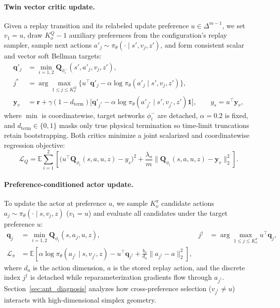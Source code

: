 \paragraph{Twin vector critic update.}
Given a replay transition and its relabeled update preference $u \in \Delta^{m-1}$,
we set $v_1 = u$, draw $K_o^Q - 1$ auxiliary preferences from the configuration's
replay sampler, sample next actions $a'_j \sim \pi_\theta(\cdot \mid s', v_j, z')$,
and form consistent scalar and vector soft Bellman targets:
\begin{align}
 \mathbf{q}'_j &= \min_{i=1,2}\mathbf{Q}_{\phi_i^-}(s', a'_j, v_j, z'), \nonumber\\
 j^* &= \arg\max_{1 \leq j \leq K_o^Q}\bigl\{u^\top\mathbf{q}'_j - \alpha\log\pi_\theta(a'_j \mid s', v_j, z')\bigr\},\nonumber\\
 \mathbf{y}_v &= \mathbf{r} + \gamma(1 - d_{\mathrm{term}})
       \bigl[\mathbf{q}'_{j^*} - \alpha\log\pi_\theta(a'_{j^*} \mid s', v_{j^*}, z')\mathbf{1}\bigr],\qquad
 y_s = u^\top\mathbf{y}_v,
 \label{eq:v25_targets}
\end{align}
where $\min$ is coordinatewise, target networks $\phi_i^-$ are detached,
$\alpha = 0.2$ is fixed, and $d_{\mathrm{term}} \in \{0,1\}$ masks only true
physical termination so time-limit truncations retain bootstrapping. Both
critics minimize a joint scalarized and coordinatewise regression objective:
\begin{equation}
 \mathcal{L}_Q = \mathbb{E}\sum_{i=1}^2\left[
 \bigl(u^\top\mathbf{Q}_{\phi_i}(s,a,u,z) - y_s\bigr)^2 +
 \frac{\lambda_o}{m}\bigl\|\mathbf{Q}_{\phi_i}(s,a,u,z) - \mathbf{y}_v\bigr\|_2^2\right].
 \label{eq:v23_critic_loss}
\end{equation}

\paragraph{Preference-conditioned actor update.}
To update the actor at preference $u$, we sample $K_o^\pi$ candidate actions
$a_j \sim \pi_\theta(\cdot \mid s, v_j, z)$ ($v_1 = u$) and evaluate all
candidates under the target preference $u$:
\begin{align}
 \mathbf{q}_j &= \min_{i=1,2}\mathbf{Q}_{\phi_i}(s, a_j, u, z),
 & j^\dagger &= \arg\max_{1 \leq j \leq K_o^\pi} u^\top\mathbf{q}_j,\\
 \mathcal{L}_\pi &= \mathbb{E}\left[
 \alpha\log\pi_\theta(a_{j^\dagger} \mid s, v_{j^\dagger}, z)
 - u^\top\mathbf{q}_{j^\dagger}
 + \frac{b_o}{d_a}\|a_{j^\dagger} - a\|_2^2\right],
 \label{eq:v23_actor_loss}
\end{align}
where $d_a$ is the action dimension, $a$ is the stored replay action, and the
discrete index $j^\dagger$ is detached while reparameterization gradients flow
through $a_{j^\dagger}$. Section~\ref{sec:ant_diagnosis} analyzes how
cross-preference selection ($v_{j^\dagger} \neq u$) interacts with
high-dimensional simplex geometry.

